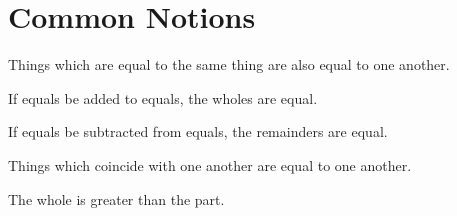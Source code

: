 
\section*{Common Notions}
\label{sec:common-notions}

\begin{rrxivremark}
\label{cn:1}
Things which are equal to the same thing are also equal to one another.
\end{rrxivremark}

\begin{rrxivremark}
\label{cn:2}
If equals be added to equals, the wholes are equal.
\end{rrxivremark}

\begin{rrxivremark}
\label{cn:3}
If equals be subtracted from equals, the remainders are equal.
\end{rrxivremark}

\begin{rrxivremark}
\label{cn:4}
Things which coincide with one another are equal to one another.
\end{rrxivremark}

\begin{rrxivremark}
\label{cn:5}
The whole is greater than the part.
\end{rrxivremark}
